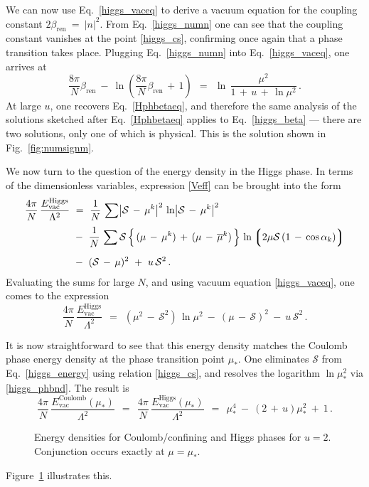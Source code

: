 \documentclass[epsfig,12pt]{article}
\def\beq{\begin{equation}}
\def\eeq{\end{equation}}
\newcommand{\cs}{{\mathcal S}}
\def\beq{\begin{equation}}
\def\eeq{\end{equation}}
\newcommand{\ov}{\overline}
\newcommand{\lgr}{\left\lgroup}
\newcommand{\rgr}{\right\rgroup}
\newcommand{\bren}{{\beta_\text{ren}}}
\begin{document}
{We can now use Eq.~\eqref{higgs_vaceq} to derive a vacuum equation
for the coupling constant $ 2\bren ~=~ |n|^2 $.
From Eq.~\eqref{higgs_numn} one can see that the coupling constant vanishes
at the point \eqref{higgs_cs}, confirming once again that a phase transition takes place.
Plugging Eq.~\eqref{higgs_numn} into Eq.~\eqref{higgs_vaceq}, one arrives at
\beq
\label{higgs_beta}
	\frac{8\pi}{N}\bren ~-~ \ln \left( \frac{8\pi}{N}\bren \,+\, 1\right) 
		~~=~~ 
	\ln\,
	\frac{\mu^2}
        {1 \,+\, u \,+\, \ln \mu^2}\,.
\eeq
At large $u$, one recovers Eq.~\eqref{Hphbetaeq}, and therefore the same analysis of the solutions
sketched after Eq.~\eqref{Hphbetaeq} applies to Eq.~\eqref{higgs_beta} --- there are two solutions,
only one of which is physical.
This is the solution shown in Fig.~\ref{fig:numsignm}.

We now turn to the question of the energy density in the Higgs phase.
In terms of the dimensionless variables, expression \eqref{Veff} can be brought into the form
\begin{align}
%
\notag
	\frac{4\pi}{N}\,\frac{E_\text{vac}^\text{Higgs}}{\Lambda^2} & ~=~ 
			\frac{1}N\, \sum \bigl| \cs \,-\, \mu^k \bigr|^2\, \ln \bigl| \cs \,-\, \mu^k \bigr|^2 
	\\[1mm]
%
	&
	~-~ \frac{1}N\, \sum \cs\, \Bigl\{\,  (\mu \,-\, \mu^k) \,+\, (\mu \,-\, \ov{\mu}{}^k) \,\Bigr\}\,
		   		   \ln \lgr 2\mu\cs\, ( 1\, -\, \cos \alpha_k ) \rgr \\[2mm]
%
\notag
	&
	~-~ ( \cs \,-\, \mu )^2 ~+~ u\, \cs^2\,.
\end{align}
Evaluating the sums for large $N$, and using vacuum equation \eqref{higgs_vaceq}, one comes to the expression
\beq
\label{higgs_energy}
	\frac{4\pi}{N}\,\frac{E_\text{vac}^\text{Higgs}}{\Lambda^2} ~~=~~
	( \mu^2 \,-\, \cs^2 )\, \ln \mu^2 ~-~ (\mu \,-\, \cs)^2 ~-~ u\, \cs^2\,.
\eeq

It is now straightforward to see that this energy density matches the Coulomb phase energy density at the
phase transition point $\mu_*$. 
One eliminates $\cs$ from Eq.~\eqref{higgs_energy} using relation \eqref{higgs_cs}, and resolves the
logarithm $ \ln \mu_*^2 $ via \eqref{higgs_phbnd}.
The result is
\beq
	\frac{4\pi}{N}\,\frac{E_\text{vac}^\text{Coulomb}(\mu_*)}{\Lambda^2} ~~=~~
	\frac{4\pi}{N}\,\frac{E_\text{vac}^\text{Higgs}(\mu_*)}{\Lambda^2} ~~=~~
	\mu_*^4 ~-~ ( 2 \,+\, u ) \mu_*^2 ~+~ 1\,.
\eeq
\begin{figure}
\epsfxsize=11cm
\centerline{}
\caption{\small 
Energy densities for Coulomb/confining and Higgs phases for $ u = 2 $.
Conjunction occurs exactly at $ \mu = \mu_* $.
}
\label{fig:higgsenergy}
\end{figure}
Figure~\ref{fig:higgsenergy} illustrates this.


}
\end{document}

